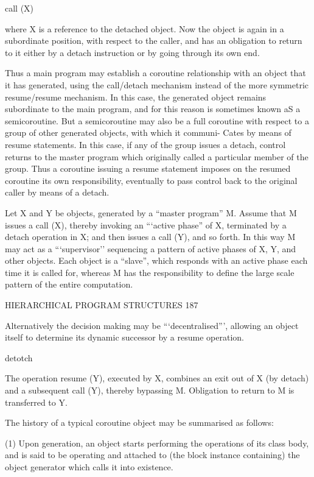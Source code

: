 call (X)

where X is a reference to the detached object. Now the object is again in a subordinate position, with respect to the caller, and has an obligation to return to it either by a detach instruction or by going through its own end.

Thus a main program may establish a coroutine relationship with an object that it has generated, using the call/detach mechanism instead of the more symmetric resume/resume mechanism. In this case, the generated object remains subordinate to the main program, and for this reason is sometimes known aS a semicoroutine. But a semicoroutine may also be a full coroutine with respect to a group of other generated objects, with which it communi- Cates by means of resume statements. In this case, if any of the group issues a detach, control returns to the master program which originally called a particular member of the group. Thus a coroutine issuing a resume statement imposes on the resumed coroutine its own responsibility, eventually to pass control back to the original caller by means of a detach.

Let X and Y be objects, generated by a “master program” M. Assume that M issues a call (X), thereby invoking an “‘active phase” of X, terminated by a detach operation in X; and then issues a call (Y), and so forth. In this way M may act as a “‘supervisor’’ sequencing a pattern of active phases of X, Y, and other objects. Each object is a “slave”, which responds with an active phase each time it is called for, whereas M has the responsibility to define the large scale pattern of the entire computation.


HIERARCHICAL PROGRAM STRUCTURES 187

Alternatively the decision making may be “‘decentralised”’, allowing an object itself to determine its dynamic successor by a resume operation.


detotch

The operation resume (Y), executed by X, combines an exit out of X (by detach) and a subsequent call (Y), thereby bypassing M. Obligation to return to M is transferred to Y.

The history of a typical coroutine object may be summarised as follows:

(1) Upon generation, an object starts performing the operations of its class body, and is said to be operating and attached to (the block instance containing) the object generator which calls it into existence.

